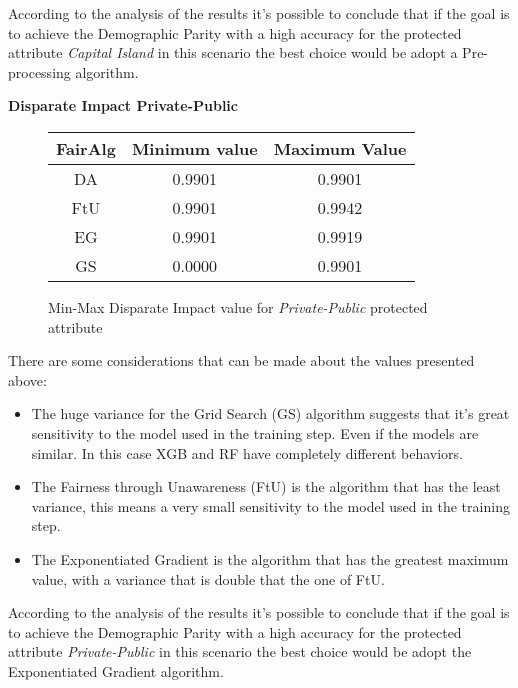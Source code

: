 According to the analysis of the results it's possible to conclude that if the goal is to achieve the Demographic Parity with a high accuracy for the protected attribute \emph{Capital Island} in this scenario the best choice would be adopt a Pre-processing algorithm.


\newpage
\textbf{Disparate Impact Private-Public}
\begin{figure}[H]
    \centering
    \begin{tabular}{|c|c|c|}
        \hline
        \textbf{FairAlg} & \textbf{Minimum value} & \textbf{Maximum Value} \\
        \hline
        DA & 0.9901 & 0.9901 \\
        \hline
        FtU & 0.9901 & 0.9942 \\
        \hline
        EG & 0.9901 & 0.9919 \\
        \hline
        GS & 0.0000 & 0.9901 \\
        \hline
    \end{tabular}
    \caption{Min-Max Disparate Impact value for \emph{Private-Public} protected attribute}
\end{figure}

There are some considerations that can be made about the values presented above:

\begin{itemize}

    \item The huge variance for the Grid Search (GS) algorithm suggests that it's great sensitivity to the model used in the training step. Even if the models are similar. In this case XGB and RF have completely different behaviors.

    \item The Fairness through Unawareness (FtU) is the algorithm that has the least variance, this means a very small sensitivity to the model used in the training step.

    \item The Exponentiated Gradient is the algorithm that has the greatest maximum value, with a variance that is double that the one of FtU.

\end{itemize}

According to the analysis of the results it's possible to conclude that if the goal is to achieve the Demographic Parity with a high accuracy for the protected attribute \emph{Private-Public} in this scenario the best choice would be adopt the Exponentiated Gradient algorithm.

